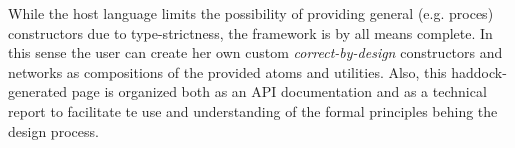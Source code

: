 \documentclass{book}
\begin{document}
\begin{titlepage}
\begin{haddockprologue}
\begin{itemize}
\end{itemize}
While the host language limits the possibility of providing general
(e.g. proces) constructors due to type-strictness, the
 framework is by all means complete. In this sense the
user can create her own custom \emph{correct-by-design} constructors and
networks as compositions of the provided atoms and utilities. Also,
this haddock-generated page is organized both as an API
documentation and as a technical report to facilitate te use and
understanding of the formal principles behing the design process.\par

\end{haddockprologue}
\end{titlepage}
\tableofcontents
















\end{document}
